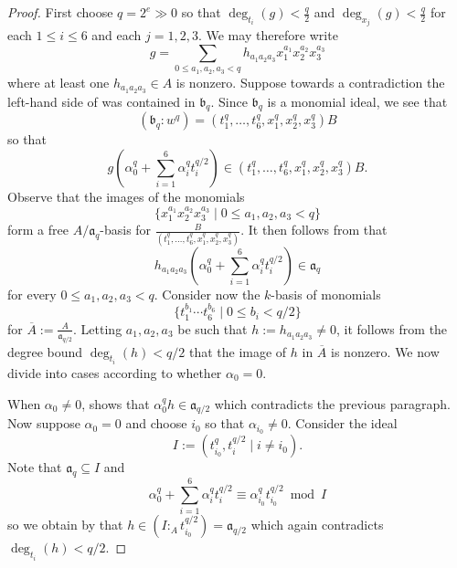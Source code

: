\documentclass[reqno,11pt]{amsart}
\makeatletter
\numberwithin{equation}{section}
\theoremstyle{definition}
\theoremstyle{definition}
\theoremstyle{definition}
\theoremstyle{remark}
\newcommand{\fa}{\mathfrak{a}}
\newcommand{\fb}{\mathfrak{b}}
\renewcommand*{\eqref}[1]{%
  \hyperref[{#1}]{\textup{\tagform@{\ref*{#1}}}}%
}
\makeatother
\begin{document}
\begin{proof}
    First choose $q=2^e\gg 0$ so that $\deg_{t_i}(g)<\frac{q}{2}$ and $\deg_{x_j}(g)<\frac{q}{2}$ for each $1\leq i\leq 6$ and each $j=1,2,3$. We may therefore write 
    \begin{equation}
        g=\sum\limits_{0\leq a_1,a_2,a_3<q}h_{a_1a_2a_3}x_1^{a_1}x_2^{a_2}x_3^{a_3} \label{eq:deg-lemma-g}
    \end{equation}
    where at least one $h_{a_1a_2a_3}\in A$ is nonzero. Suppose towards a contradiction the left-hand side of \eqref{eq:deg-lemma} was contained in $\fb_q$. Since $\fb_q$ is a monomial ideal, we see that
    $$(\fb_q:w^q)=(t_1^q,\ldots, t_6^q,x_1^q,x_2^q,x_3^q)B$$ so that
    \begin{equation}
g\left(\alpha_0^q+\sum\limits_{i=1}^6\alpha_i^q t_i^{q/2}\right)\in (t_1^q,\ldots, t_6^q,x_1^q,x_2^q,x_3^q)B.\label{eq:deg-lemma-g-2}
    \end{equation}
    Observe that the images of the monomials $$\{x_1^{a_1}x_2^{a_2}x_3^{a_3}\mid 0\leq a_1,a_2,a_3<q\}$$ form a free $A/\fa_q$-basis for $\frac{B}{(t_1^q,\ldots, t_6^q,x_1^q,x_2^q,x_3^q)}$. It then follows from \eqref{eq:deg-lemma-g-2} that 
    \begin{equation}
h_{a_1a_2a_3}\left(\alpha_0^q+\sum\limits_{i=1}^6\alpha_i^q t_i^{q/2}\right)\in\fa_q\label{eq:in-aq}
    \end{equation} for every $0\leq a_1,a_2,a_3<q$. Consider now the $k$-basis of monomials $$\{t_1^{b_1}\cdots t_6^{b_6}\mid 0\leq b_i<q/2\}$$ for $\overline{A}:=\frac{A}{\fa_{q/2}}$. Letting $a_1,a_2,a_3$ be such that $h:=h_{a_1a_2a_3}\neq 0$, it follows from the degree bound $\deg_{t_i}(h)<q/2$ that the image of $h$ in $\overline{A}$ is nonzero. We now divide into cases according to whether $\alpha_0=0$.

When $\alpha_0\neq 0$, \eqref{eq:in-aq} shows that $\alpha_0^q h\in \fa_{q/2}$ which contradicts the previous paragraph. Now suppose $\alpha_0=0$ and choose $i_0$ so that $\alpha_{i_0}\neq 0$. Consider the ideal $$I:=(t_{i_0}^q,t_i^{q/2}\mid i\neq i_0).$$ Note that $\fa_q\subseteq I$ and $$\alpha_0^q+\sum\limits_{i=1}^6\alpha_i^q t_i^{q/2}\equiv \alpha_{i_0}^qt_{i_0}^{q/2}\bmod I$$ so we obtain by \eqref{eq:in-aq} that $h\in (I:_A t_{i_0}^{q/2})=\fa_{q/2}$ which again contradicts $\deg_{t_i}(h)<q/2$.
\end{proof}
    
\end{document}
